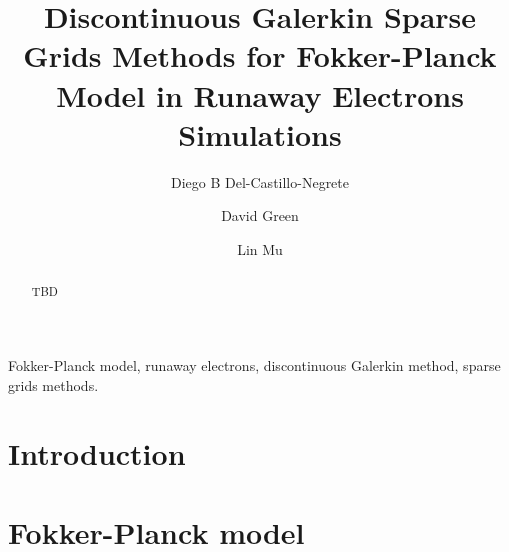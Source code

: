 \documentclass[preprint,11pt]{elsarticle}
\begin{document}
\begin{frontmatter}

\title{Discontinuous Galerkin Sparse Grids Methods for Fokker-Planck Model in Runaway Electrons Simulations}



\author[1]{Diego B Del-Castillo-Negrete}
\address[1]{Fusion \& Materials for Nuclear Systems Division
Oak Ridge National Laboratory, Oak Ridge, TN 37831, USA}

\author[2]{David Green}
\address[2]{Fusion \& Materials for Nuclear Systems Division
Oak Ridge National Laboratory, Oak Ridge, TN 37831, USA}

\author[3]{Lin Mu}%
\address[3]{Computer and Applied Mathematics Division, Oak Ridge National Laboratory, Oak Ridge,  TN 37831, USA}



\begin{abstract}
TBD
\end{abstract}

\begin{keyword}
Fokker-Planck model, runaway electrons, discontinuous Galerkin method, sparse grids methods.
\end{keyword}

\end{frontmatter}


\section{Introduction}\label{Sect:Intro}



\section{Fokker-Planck model}\label{Sect:Mod}
\end{document}
